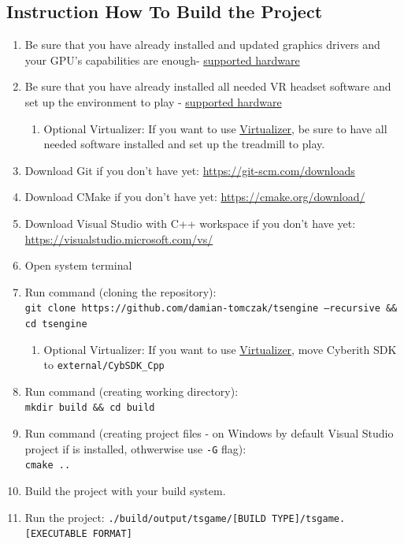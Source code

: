 \subsection{Instruction How To Build the Project}
\label{sec:how_to_run}
\begin{enumerate}
    \item Be sure that you have already installed and updated graphics drivers and your GPU's capabilities are enough- \hyperref[sec:hardware]{supported hardware}
    \item Be sure that you have already installed all needed VR headset software and set up the environment to play - \hyperref[sec:hardware]{supported hardware}
    \begin{enumerate}
        \item Optional Virtualizer: If you want to use \hyperref[sec:virtualizer]{Virtualizer}, be sure to have all needed software installed and set up the treadmill to play.
    \end{enumerate}
    \item Download Git if you don't have yet:
        \href{https://git-scm.com/downloads}{https://git-scm.com/downloads}
    \item Download CMake if you don't have yet:
        \href{https://cmake.org/download/}{https://cmake.org/download/}
    \item Download Visual Studio with C++ workspace if you don't have yet:
        \href{https://visualstudio.microsoft.com/vs/}{https://visualstudio.microsoft.com/vs/}
    \item Open system terminal
    \item Run command (cloning the repository):\\
        \texttt{git clone https://github.com/damian-tomczak/tsengine --recursive \&\& cd tsengine}
    \begin{enumerate}
        \item Optional Virtualizer: If you want to use \hyperref[sec:virtualizer]{Virtualizer}, move Cyberith SDK to \texttt{external/CybSDK\_Cpp}
    \end{enumerate}
    \item Run command (creating working directory):\\
        \texttt{mkdir build \&\& cd build}
    \item Run command (creating project files - on Windows by default Visual Studio project if is installed, othwerwise use \texttt{-G} flag):\\
        \texttt{cmake ..}
    \item Build the project with your build system.
    \item Run the project: \texttt{./build/output/tsgame/[BUILD TYPE]/tsgame.[EXECUTABLE FORMAT]}
\end{enumerate}
\newpage
